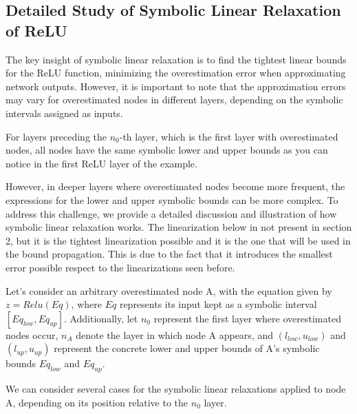 \subsection{Detailed Study of Symbolic Linear Relaxation of ReLU}
\label{subsec:symbolic-linear-relaxation}
The key insight of symbolic linear relaxation is to find the tightest linear bounds for the ReLU function, minimizing the overestimation error when approximating network outputs. However, it is important to note that the approximation errors may vary for overestimated nodes in different layers, depending on the symbolic intervals assigned as inputs.

For layers preceding the $n_0$-th layer, which is the first layer with overestimated nodes, all nodes have the same symbolic lower and upper bounds as you can notice in the first ReLU layer of the example.

However, in deeper layers where overestimated nodes become more frequent, the expressions for the lower and upper symbolic bounds can be more complex. To address this challenge, we provide a detailed discussion and illustration of how symbolic linear relaxation works.
The linearization below in not present in section 2, but it is the tightest linearization possible and it is the one that will be used in the bound propagation. This is due to the fact that it introduces the smallest error possible respect to the linearizations seen before.

Let's consider an arbitrary overestimated node A, with the equation given by $z = Relu(Eq)$, where $Eq$ represents its input kept as a symbolic interval $[Eq_{low}, Eq_{up}]$. Additionally, let $n_0$ represent the first layer where overestimated nodes occur, $n_A$ denote the layer in which node A appears, and $(l_{low}, u_{low})$ and $(l_{up}, u_{up})$ represent the concrete lower and upper bounds of A's symbolic bounds $Eq_{low}$ and $Eq_{up}$.

We can consider several cases for the symbolic linear relaxations applied to node A, depending on its position relative to the $n_0$ layer.
    

